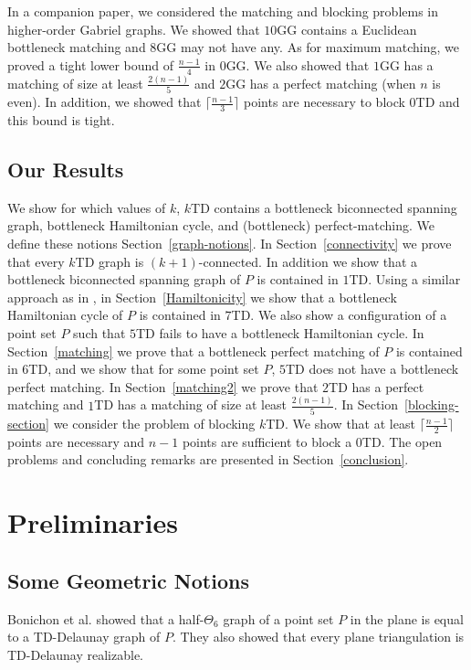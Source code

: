 \documentclass[11pt,a4paper]{article}
\newcommand{\kTD}[2]{$#1$\text{-}TD#2}
\newcommand{\kGG}[2]{$#1$\text{-}GG#2}
\begin{document}
In a companion paper, we considered the matching and blocking problems in higher-order Gabriel graphs. We showed that \kGG{10}{} contains a Euclidean bottleneck matching and \kGG{8}{} may not have any. As for maximum matching, we proved a tight lower bound of $\frac{n-1}{4}$ in \kGG{0}{}. We also showed that \kGG{1}{} has a matching of size at least $\frac{2(n-1)}{5}$ and \kGG{2}{} has a perfect matching (when $n$ is even). In addition, we showed that $\lceil\frac{n-1}{3}\rceil$ points are necessary to block \kTD{0}{} and this bound is tight.
\subsection{Our Results}
\label{our-results}
We show for which values of $k$, \kTD{k}{} contains a bottleneck biconnected spanning graph, bottleneck Hamiltonian cycle, and (bottleneck) perfect-matching. We define these notions Section~\ref{graph-notions}. In Section~\ref{connectivity} we prove that every \kTD{k}{} graph is $(k+1)$-connected. In addition we show that a bottleneck biconnected spanning graph of $P$ is contained in \kTD{1}{}. Using a similar approach as in \cite{Abellanas2009, Chang1991}, in Section~\ref{Hamiltonicity} we show that a bottleneck Hamiltonian cycle of $P$ is contained in \kTD{7}{}. We also show a configuration of a point set $P$ such that \kTD{5}{} fails to have a bottleneck Hamiltonian cycle. In Section~\ref{matching} we prove that a bottleneck perfect matching of $P$ is contained in \kTD{6}{}, and we show that for some point set $P$, \kTD{5}{} does not have a bottleneck perfect matching. In Section~\ref{matching2} we prove that \kTD{2}{} has a perfect matching and \kTD{1}{} has a matching of size at least $\frac{2(n-1)}{5}$. In Section~\ref{blocking-section} we consider the problem of blocking \kTD{k}{}. We show that at least $\lceil\frac{n-1}{2}\rceil$ points are necessary and $n-1$ points are sufficient to block a \kTD{0}{}. The open problems and concluding remarks are presented in Section~\ref{conclusion}.

\section{Preliminaries}
\label{preliminaries}
\subsection{Some Geometric Notions}
\label{geometric-notions}
Bonichon et al. \cite{Bonichon2010} showed that a half-$\Theta_6$ graph of a point set $P$ in the plane is equal to a TD-Delaunay graph of $P$. They also showed that every plane triangulation is TD-Delaunay realizable. 
\end{document}
